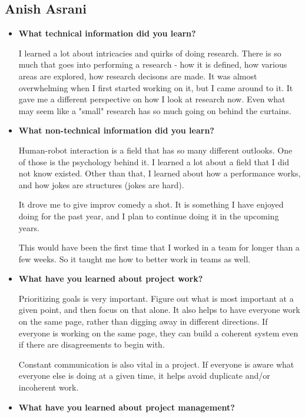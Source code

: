 \pagebreak

\subsection{Anish Asrani}

\begin{itemize}
\item{\textbf{What technical information did you learn?}}

    I learned a lot about intricacies and quirks of doing research. There is so much that goes into performing a research -
    how it is defined, how various areas are explored, how research decisons are made. It was almost overwhelming when I first
    started working on it, but I came around to it. It gave me a different perspective on how I look at research now.
    Even what may seem like a "small" research has so much going on behind the curtains.

\item{\textbf{What non-technical information did you learn?}}

    Human-robot interaction is a field that has so many different outlooks. One of those is the psychology behind it.
    I learned a lot about a field that I did not know existed. Other than that, I learned about how a performance works,
    and how jokes are structures (jokes are hard).

    It drove me to give improv comedy a shot. It is something I have enjoyed doing for the past year, and I plan to continue
    doing it in the upcoming years.

    This would have been the first time that I worked in a team for longer than a few weeks. So it taught me how to better work
    in teams as well.

\item{\textbf{What have you learned about project work?}}

    Prioritizing goals is very important. Figure out what is most important at a given point, and then focus on that alone.
    It also helps to have everyone work on the same page, rather than digging away in different directions. If everyone is working on the same page,
    they can build a coherent system even if there are disagreements to begin with.

    Constant communication is also vital in a project. If everyone is aware what everyone else is doing at a given time, it helps avoid
    duplicate and/or incoherent work.

\item{\textbf{What have you learned about project management?}}


\end{itemize}
